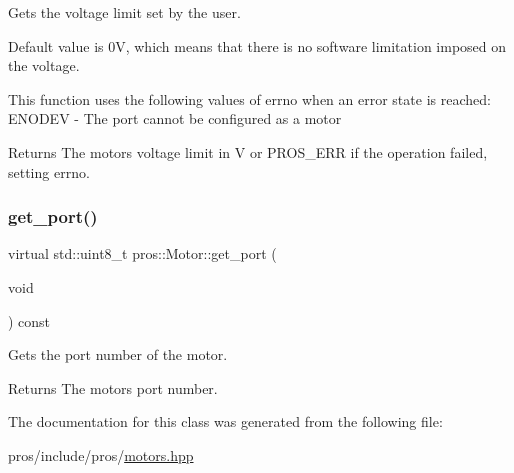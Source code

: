 Gets the voltage limit set by the user. 

Default value is 0V, which means that there is no software limitation imposed on the voltage.

This function uses the following values of errno when an error state is reached\+: E\+N\+O\+D\+EV -\/ The port cannot be configured as a motor

\begin{DoxyReturn}{Returns}
The motor\textquotesingle{}s voltage limit in V or P\+R\+O\+S\+\_\+\+E\+RR if the operation failed, setting errno. 
\end{DoxyReturn}
\mbox{\label{classpros_1_1Motor_a5b0e644c8af396a6af8142b41d1bc7b6}} 
\subsubsection{\texorpdfstring{get\+\_\+port()}{get\_port()}}
{\footnotesize\ttfamily virtual std\+::uint8\+\_\+t pros\+::\+Motor\+::get\+\_\+port (\begin{DoxyParamCaption}\item[{void}]{ }\end{DoxyParamCaption}) const\hspace{0.3cm}{\ttfamily [virtual]}}



Gets the port number of the motor. 

\begin{DoxyReturn}{Returns}
The motor\textquotesingle{}s port number. 
\end{DoxyReturn}


The documentation for this class was generated from the following file\+:\begin{DoxyCompactItemize}
\item 
pros/include/pros/\hyperlink{motors_8hpp}{motors.\+hpp}\end{DoxyCompactItemize}
